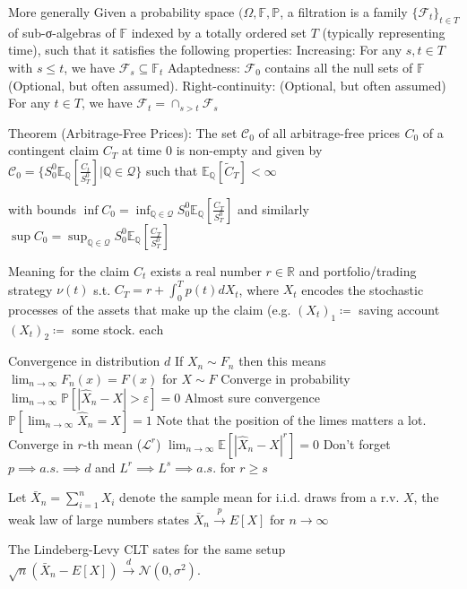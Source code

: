 More generally
Given a probability space \( (\Omega, \mathbb{F}, \mathbb{P} \), a filtration is a family \(\{\mathcal{F}_t\}_{t \in T}\) of sub-σ-algebras of \( \mathbb{F} \) indexed by a totally ordered set \( T \) (typically representing time), such that it satisfies the following properties:
Increasing: For any \( s, t \in T \) with \( s \leq t \), we have \( \mathcal{F}_s \subseteq \mathbb{F}_t \)
Adaptedness: \( \mathcal{F}_{0} \) contains all the null sets of \( \mathbb{F} \) (Optional, but often assumed).
Right-continuity: (Optional, but often assumed) For any \( t \in T \), we have \( \mathcal{F}_t = \cap_{s > t} \mathcal{F}_s \)

Theorem (Arbitrage-Free Prices): The set \( \mathcal{C}_{0} \) of all arbitrage-free prices  \( C_0 \) of a contingent claim \( C_T \) at time \( 0 \) is non-empty and given by  \( \mathcal{C_0} = \{S^{0}_{0}\mathbb{E}_{\mathbb{Q}}[\frac{C_{t}}{S^{0}_{T}}] | \mathbb{Q} \in \mathcal{Q}\} \) such that \( \mathbb{E}_{\mathbb{Q}}[\tilde{C}_T] < \infty\) 


with bounds \( \inf C_0 = \inf_{\mathbb{Q} \in \mathcal{Q}} S_0^0 \mathbb{E}_{\mathbb{Q}}[\frac{C_T}{S^0_T}] \)
and similarly \( \sup C_0 = \sup_{\mathbb{Q} \in \mathcal{Q}} S_0^0 \mathbb{E}_{\mathbb{Q}}[\frac{C_T}{S^0_T}] \)

Meaning for the claim \( C_t \) exists a real number \( r \in \mathbb{R} \) and portfolio/trading strategy \( \nu(t) \) s.t.
\( C_T = r + \int_{0}^{T} p(t) dX_t \), where \( X_t \) encodes the stochastic processes of the assets that make up the claim
(e.g. \( (X_t)_1 \coloneqq  \) saving account \( (X_t)_2 \coloneqq \) some stock.
each 

Convergence in distribution \( d \)
If \( X_n \sim F_n \) then this means
\( \lim_{n \to \infty} F_n(x) = F(x) \)
for \( X \sim F \)
Converge in probability 
\( \lim_{n \to \infty} \mathbb{P}[|\hat{X}_n - X| > \varepsilon] = 0 \)
Almost sure convergence 
\( \mathbb{P}[\lim_{n \to \infty} \hat{X}_n = X] = 1\)
Note that the position of the limes matters a lot.
Converge in \( r \)-th mean (\(\mathcal{L}^r\))
\( \lim_{n \to \infty} \mathbb{E}[|\hat{X}_n - X|^r] = 0\)
Don't forget \( p \implies a.s. \implies d \)
and \( L^r \implies L^s \implies a.s. \) for \( r \geq s \)


Let \(\bar{X}_n = \sum_{i=1}^n X_i\) denote the sample mean for i.i.d. draws from a r.v. \(X\), the weak law of large numbers
states \(\bar{X}_n \xrightarrow{p} E[X]\) for \(n \to \infty\)

The Lindeberg-Levy CLT sates for the same setup
\( \sqrt{n}(\bar{X}_n - E[X]) \xrightarrow{d} \mathcal{N}(0, \sigma^2) \).

